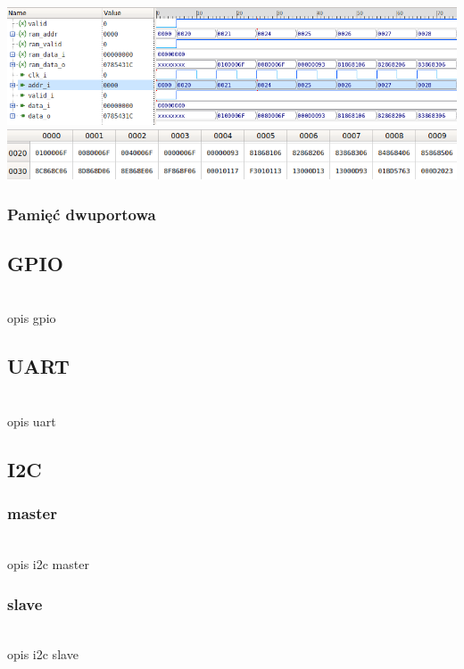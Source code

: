 \documentclass[11pt,a4paper]{article}
\begin{document}
					\begin{minipage}{\textwidth}
				\begin{center}
					\includegraphics[width=15cm]{./rysunki/ram_sim.png}
					\includegraphics[width=15cm]{./rysunki/pamiec_ram.png}
				\end{center}
			\end{minipage} 
			
		\subsubsection{Pamięć dwuportowa}
			\hspace{5mm}
			
	\subsection{GPIO}
	\hspace{5mm}
		\\opis gpio

	\subsection{UART}
	\hspace{5mm}
		\\opis uart

	\subsection{I2C}
		\subsubsection{master}
		\hspace{5mm}
			\\opis i2c master
		\subsubsection{slave}
		\hspace{5mm}
			\\opis i2c slave
\end{document}
